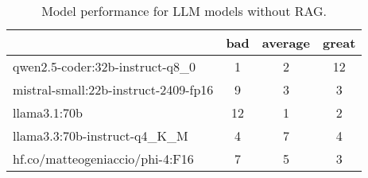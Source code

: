 \begin{table}[H]
\centering
\begin{tabular}[H]{|l|c|c|c|}
\toprule
 & bad & average & great \\
\midrule
qwen2.5-coder:32b-instruct-q8\_0 & 1 & 2 & 12 \\
mistral-small:22b-instruct-2409-fp16 & 9 & 3 & 3 \\
llama3.1:70b & 12 & 1 & 2 \\
llama3.3:70b-instruct-q4\_K\_M & 4 & 7 & 4 \\
hf.co/matteogeniaccio/phi-4:F16 & 7 & 5 & 3 \\
\bottomrule
\end{tabular}
\caption{Model performance for LLM models without RAG.}
\end{table}
